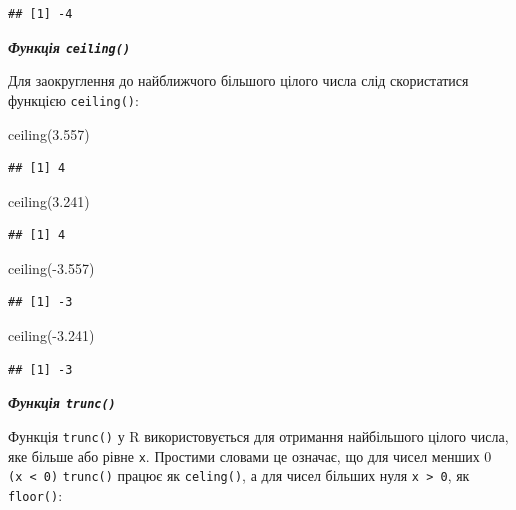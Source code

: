 \documentclass[
]{book}
\newenvironment{Shaded}{\begin{snugshade}}{\end{snugshade}}
\newcommand{\FloatTok}[1]{\textcolor[rgb]{0.00,0.00,0.81}{#1}}
\newcommand{\FunctionTok}[1]{\textcolor[rgb]{0.00,0.00,0.00}{#1}}
\newcommand{\NormalTok}[1]{#1}
\newcommand{\SpecialCharTok}[1]{\textcolor[rgb]{0.00,0.00,0.00}{#1}}
\begin{document}
\begin{verbatim}
## [1] -4
\end{verbatim}

\emph{\textbf{Функція \texttt{ceiling()}}}

Для заокруглення до найближчого більшого цілого числа слід скористатися функцією \texttt{ceiling()}:

\begin{Shaded}
\begin{Highlighting}[]
\FunctionTok{ceiling}\NormalTok{(}\FloatTok{3.557}\NormalTok{)}
\end{Highlighting}
\end{Shaded}

\begin{verbatim}
## [1] 4
\end{verbatim}

\begin{Shaded}
\begin{Highlighting}[]
\FunctionTok{ceiling}\NormalTok{(}\FloatTok{3.241}\NormalTok{)}
\end{Highlighting}
\end{Shaded}

\begin{verbatim}
## [1] 4
\end{verbatim}

\begin{Shaded}
\begin{Highlighting}[]
\FunctionTok{ceiling}\NormalTok{(}\SpecialCharTok{{-}}\FloatTok{3.557}\NormalTok{)}
\end{Highlighting}
\end{Shaded}

\begin{verbatim}
## [1] -3
\end{verbatim}

\begin{Shaded}
\begin{Highlighting}[]
\FunctionTok{ceiling}\NormalTok{(}\SpecialCharTok{{-}}\FloatTok{3.241}\NormalTok{)}
\end{Highlighting}
\end{Shaded}

\begin{verbatim}
## [1] -3
\end{verbatim}

\emph{\textbf{Функція \texttt{trunc()}}}

Функція \texttt{trunc()} у R використовується для отримання найбільшого цілого числа, яке більше або рівне \texttt{x}. Простими словами це означає, що для чисел менших 0 \texttt{(x\ \textless{}\ 0)} \texttt{trunc()} працює як \texttt{celing()}, а для чисел більших нуля \texttt{x\ \textgreater{}\ 0}, як \texttt{floor()}:
\end{document}
